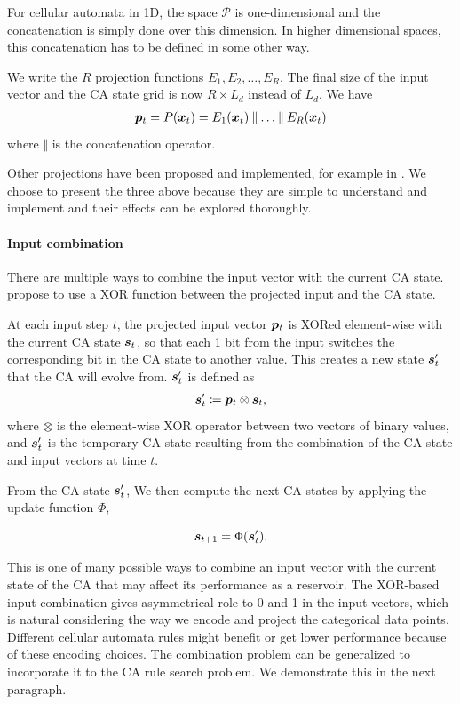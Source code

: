 For cellular automata in 1D, the space $\mathcal{P}$ is one-dimensional and the
concatenation is simply done over this dimension. In higher dimensional spaces,
this concatenation has to be defined in some other way.

We write the $R$ projection functions $E_{1}, E_{2}, \ldots, E_{R}$. The final size
of the input vector and the CA state grid is now $R \times L_{d}$ instead of $L_{d}$.
We have
\begin{align}
  {\bm{p}}_{t} = P({\bm{x}}_{t}) = E_{1}({\bm{x}}_{t})\mathbin\Vert \ldots \mathbin \Vert E_{R}({\bm{x}}_{t})
\end{align}
where $\mathbin\Vert$ is the concatenation operator.

Other projections have been proposed and implemented, for example in
\parencite{yilmazReservoirComputingUsing2014}. We choose to present the three
above because they are simple to understand and implement and their effects can
be explored thoroughly.

\paragraph{Input combination}
There are multiple ways to combine the input vector with the current \ac{CA}
state. \textcite{gloverDynamicalLandscapeReservoir2021} propose to use a XOR
function between the projected input and the \ac{CA} state.

At each input step $t$, the projected input vector ${\bm{p}}_{t}$ is XORed
element-wise with the current CA state ${\bm{s}}_{t}$, so that each 1 bit from the
input switches the corresponding bit in the CA state to another value. This
creates a new state ${\bm{s}}_{t}'$ that the CA will evolve from. ${\bm{s}}_{t}'$ is
defined as
\begin{align}
  {\bm{s}}_{t}' \coloneqq {\bm{p}}_{t} \otimes {\bm{s}}_{t},
\end{align}
where $\otimes$ is the element-wise XOR operator between two vectors of binary
values, and ${\bm{s}}'_{t}$ is the temporary CA state resulting from the combination
of the CA state and input vectors at time $t$.

From the \ac{CA} state ${\bm{s}}'_{t}$, We then compute the next CA states by
applying the update function $\Phi$,

\begin{equation}
  \label{eq:ca-state}
  {\bm{s}}_{t + 1} = \Phi({\bm{s}}'_{t}).
\end{equation}

This is one of many possible ways to combine an input vector with the current
state of the CA that may affect its performance as a reservoir. The XOR-based
input combination gives asymmetrical role to 0 and 1 in the input vectors, which
is natural considering the way we encode and project the categorical data
points. Different cellular automata rules might benefit or get lower performance
because of these encoding choices. The combination problem can be generalized to
incorporate it to the \ac{CA} rule search problem. We demonstrate this in the
next paragraph.

